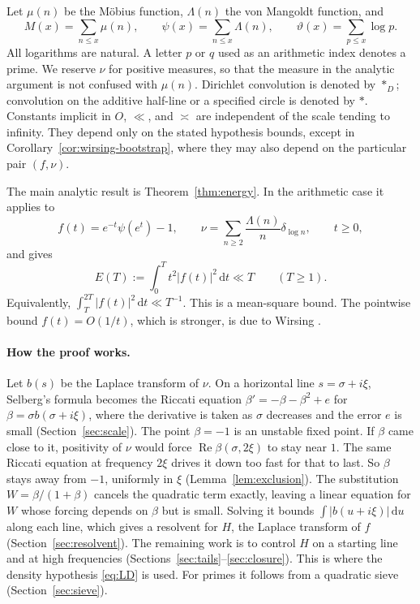 \documentclass[11pt,letterpaper]{article}
\numberwithin{equation}{section}
\theoremstyle{definition}
\theoremstyle{remark}
\newcommand{\dd}{\,\mathrm d}
\newcommand{\Rea}{\operatorname{Re}}
\begin{document}
Let $\mu(n)$ be the M\"obius function, $\Lambda(n)$ the von Mangoldt function,
and
\[
 M(x)=\sum_{n\le x}\mu(n),\qquad
 \psi(x)=\sum_{n\le x}\Lambda(n),\qquad
 \vartheta(x)=\sum_{p\le x}\log p.
\]
All logarithms are natural. A letter $p$ or $q$ used as an arithmetic index
denotes a prime. We reserve $\nu$ for positive measures, so that the measure
in the analytic argument is not confused with $\mu(n)$. Dirichlet convolution
is denoted by $*_D$; convolution on the additive half-line or a specified
circle is denoted by $*$. Constants implicit in $O$, $\ll$, and $\asymp$ are
independent of the scale tending to infinity. They depend only on the
stated hypothesis bounds, except in Corollary~\ref{cor:wirsing-bootstrap},
where they may also depend on the particular pair $(f,\nu)$.

The main analytic result is Theorem~\ref{thm:energy}. In the arithmetic
case it applies to
\begin{equation}\label{eq:arith-source}
 f(t)=e^{-t}\psi(e^t)-1,\qquad
 \nu=\sum_{n\ge2}\frac{\Lambda(n)}n\delta_{\log n},\qquad t\ge0,
\end{equation}
and gives
\begin{equation}\label{eq:main-energy}
 E(T):=\int_0^T t^2|f(t)|^2\dd t\ll T\qquad(T\ge1).
\end{equation}
Equivalently, $\int_T^{2T}|f(t)|^2\dd t\ll T^{-1}$. This is a mean-square
bound. The pointwise bound $f(t)=O(1/t)$, which is stronger, is due to
Wirsing \cite{wirsing1,wirsing2}.

\paragraph{How the proof works.}
Let $b(s)$ be the Laplace transform of $\nu$. On a horizontal line
$s=\sigma+i\xi$, Selberg's formula becomes the Riccati equation
$\beta'=-\beta-\beta^2+e$ for $\beta=\sigma b(\sigma+i\xi)$, where the
derivative is taken as $\sigma$ decreases and the error $e$ is small
(Section~\ref{sec:scale}). The point $\beta=-1$ is an unstable fixed point.
If $\beta$ came close to it, positivity of $\nu$ would force
$\Rea\beta(\sigma,2\xi)$ to stay near $1$. The same Riccati equation at
frequency $2\xi$ drives it down too fast for that to last. So
$\beta$ stays away from $-1$, uniformly in $\xi$
(Lemma~\ref{lem:exclusion}). The substitution $W=\beta/(1+\beta)$ cancels the
quadratic term exactly, leaving a linear equation for $W$ whose forcing
depends on $\beta$ but is small. Solving it bounds
$\int|b(u+i\xi)|\dd u$ along each line, which gives a resolvent for $H$,
the Laplace transform of $f$ (Section~\ref{sec:resolvent}). The remaining
work is to control $H$ on a starting line and at high frequencies
(Sections~\ref{sec:tails}--\ref{sec:closure}). This is where the density
hypothesis \eqref{eq:LD} is used. For primes it follows from a quadratic
sieve (Section~\ref{sec:sieve}).
\end{document}
